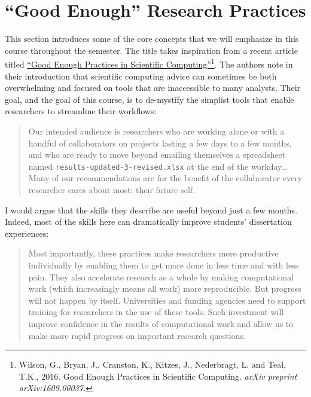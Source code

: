 \documentclass[]{book}
\let\rmarkdownfootnote\footnote%
\def\footnote{\protect\rmarkdownfootnote}
\theoremstyle{definition}
\theoremstyle{definition}
\theoremstyle{definition}
\theoremstyle{remark}
\begin{document}
\chapter{\texorpdfstring{``Good Enough'' Research
Practices}{Good Enough Research Practices}}\label{good-enough-research-practices}

This section introduces some of the core concepts that we will emphasize
in this course throughout the semester. The title takes inspiration from
a recent article titled \href{https://arxiv.org/abs/1609.00037}{``Good
Enough Practices in Scientific Computing''}\footnote{Wilson, G., Bryan,
  J., Cranston, K., Kitzes, J., Nederbragt, L. and Teal, T.K., 2016.
  Good Enough Practices in Scientific Computing. \emph{arXiv preprint
  arXiv:1609.00037.}}. The authors note in their introduction that
scientific computing advice can sometimes be both overwhelming and
focused on tools that are inaccessible to many analysts. Their goal, and
the goal of this course, is to de-mystify the simplist tools that enable
researchers to streamline their workflows:

\begin{quote}
Our intended audience is researchers who are working alone or with a
handful of collaborators on projects lasting a few days to a few months,
and who are ready to move beyond emailing themselves a spreadsheet named
\texttt{results-updated-3-revised.xlsx} at the end of the
workday\ldots{}Many of our recommendations are for the benefit of the
collaborator every researcher cares about most: their future self.
\end{quote}

I would argue that the skills they describe are useful beyond just a few
months. Indeed, most of the skills here can dramatically improve
students' dissertation experiences:

\begin{quote}
Most importantly, these practices make researchers more productive
individually by enabling them to get more done in less time and with
less pain. They also accelerate research as a whole by making
computational work (which increasingly means all work) more
reproducible. But progress will not happen by itself. Universities and
funding agencies need to support training for researchers in the use of
these tools. Such investment will improve confidence in the results of
computational work and allow us to make more rapid progress on important
research questions.
\end{quote}
\end{document}
